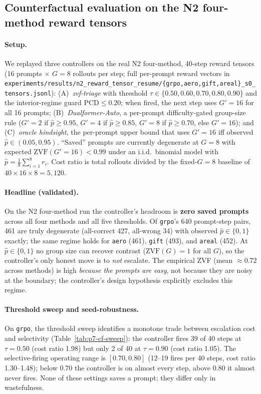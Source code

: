 \iffalse
\subsection{Counterfactual evaluation on the N2 four-method reward tensors}
\label{sec:p7-controller-cf}
\paragraph{Setup.}
We replayed three controllers on the real N2 four-method, 40-step reward
tensors (16 prompts $\times$ $G{=}8$ rollouts per step; full per-prompt
reward vectors in
\texttt{experiments/results/n2\_reward\_tensor\_resume/\{grpo,aero,gift,areal\}\_s0\_tensors.jsonl}):
(A)~\emph{zvf-triage} with threshold $\tau \in \{0.50, 0.60, 0.70, 0.80, 0.90\}$
and the interior-regime guard $\mathrm{PCD} \le 0.20$; when fired, the next
step uses $G'{=}16$ for all 16 prompts;
(B)~\emph{Dualformer-Auto}, a per-prompt
difficulty-gated group-size rule ($G'{=}2$ if
$\hat p \ge 0.95$, $G'{=}4$ if $\hat p \ge 0.85$, $G'{=}8$ if $\hat p \ge
0.70$, else $G'{=}16$); and (C)~\emph{oracle hindsight}, the per-prompt
upper bound that uses $G'{=}16$ iff observed $\hat p \in (0.05, 0.95)$.
``Saved'' prompts are currently degenerate at $G{=}8$ with expected
$\mathrm{ZVF}(G'{=}16) < 0.99$ under an i.i.d.\ binomial model with
$\hat p = \frac{1}{8}\sum_{i=1}^{8} r_i$. Cost ratio is total rollouts
divided by the fixed-$G{=}8$ baseline of $40 \times 16 \times 8 = 5{,}120$.

\paragraph{Headline (validated).}
On the N2 four-method run the controller's headroom is
\textbf{zero saved prompts} across all four methods and all five
thresholds. Of \texttt{grpo}'s 640 prompt-step pairs, 461 are truly
degenerate (all-correct 427, all-wrong 34) with observed
$\hat p \in \{0,1\}$ exactly; the same regime holds for
\texttt{aero} (461), \texttt{gift} (493), and \texttt{areal} (452).
At $\hat p \in \{0,1\}$ no group size can recover contrast
($\mathrm{ZVF}(G) = 1$ for all $G$), so the controller's only honest
move is to \emph{not} escalate. The empirical ZVF (mean $\approx 0.72$
across methods) is high \emph{because the prompts are easy}, not because
they are noisy at the boundary; the controller's design hypothesis
explicitly excludes this regime.

\paragraph{Threshold sweep and seed-robustness.}
On \texttt{grpo}, the threshold sweep identifies a monotone trade
between escalation cost and selectivity (Table~\ref{tab:p7-cf-sweep}):
the controller fires 39 of 40 steps at $\tau{=}0.50$ (cost ratio 1.98)
but only 2 of 40 at $\tau{=}0.90$ (cost ratio 1.05). The selective-firing
operating range is $[0.70, 0.80]$ (12--19 fires per 40 steps,
cost ratio 1.30--1.48); below 0.70 the controller is on almost every
step, above 0.80 it almost never fires. None of these settings saves a
prompt; they differ only in wastefulness.

